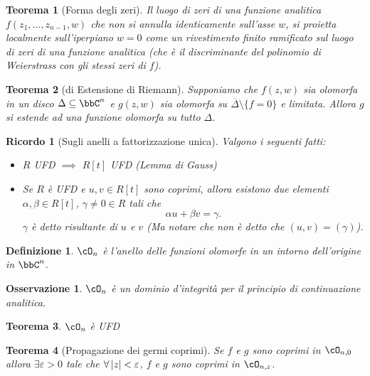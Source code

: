 \documentclass[a4paper,11pt]{article}
\newtheorem{teorema}{Teorema}
\newtheorem{definizione}{Definizione}
\newtheorem{ricordo}{Ricordo}
\newtheorem{osservazione}{Osservazione}
\begin{document}
\begin{teorema}[Forma degli zeri]
  Il luogo di zeri di una funzione analitica $f(z_1, \ldots, z_{n-1}, w)$ che non si annulla identicamente sull'asse $w$, si proietta localmente sull'iperpiano $w = 0$ come un rivestimento finito ramificato sul luogo di zeri di una funzione analitica (che è il discriminante del polinomio di Weierstrass con gli stessi zeri di $f$).
\end{teorema}

\begin{teorema}[di Estensione di Riemann]
  Supponiamo che $f(z, w)$ sia olomorfa in un disco $\Delta \subseteq \bbC^n$ e $g(z, w)$ sia olomorfa su $\overline\Delta \setminus \{ f = 0 \}$ e limitata. Allora $g$ si estende ad una funzione olomorfa su tutto $\Delta$.
\end{teorema}

\begin{ricordo}[Sugli anelli a fattorizzazione unica]
  Valgono i seguenti fatti:
  \begin{itemize}
  \item $R$ UFD $\implies$ $R[t]$ UFD (Lemma di Gauss)
  \item Se $R$ è UFD e $u, v \in R[t]$ sono coprimi, allora esistono due elementi $\alpha, \beta \in R[t]$, $\gamma \neq 0 \in R$ tali che
    $$ \alpha u + \beta v = \gamma. $$
    $\gamma$ è detto risultante di $u$ e $v$ (Ma notare che non è detto che $(u, v) = (\gamma)$).
  \end{itemize}
\end{ricordo}

\begin{definizione}
  $\cO_n$ è l'anello delle funzioni olomorfe in un intorno dell'origine in $\bbC^n$.
\end{definizione}

\begin{osservazione}
  $\cO_n$ è un dominio d'integrità per il principio di continuazione analitica.
\end{osservazione}

\begin{teorema}
  $\cO_n$ è UFD
\end{teorema}

\begin{teorema}[Propagazione dei germi coprimi]
  Se $f$ e $g$ sono coprimi in $\cO_{n, 0}$ allora $\exists \varepsilon > 0$ tale che $\forall \left|{z}\right| < \varepsilon$, $f$ e $g$ sono coprimi in $\cO_{n, z}$.
\end{teorema}
\end{document}
